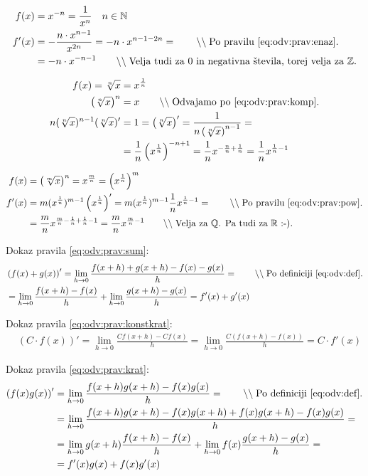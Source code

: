 \documentclass[a4paper,oneside,12pt,fleqn]{article}
\def\R{\ensuremath{\mathbb R}}
\def\N{\ensuremath{\mathbb N}}
\def\Z{\ensuremath{\mathbb Z}}
\def\Q{\ensuremath{\mathbb Q}}
\newcommand\krat\cdot
\newcommand{\comment}[1]{\ensuremath{\qquad\backslash\backslash\;}\textnormal{#1}}
\def\limh{\lim_{h\rightarrow0}} %
\numberwithin{equation}{section}
\begin{document}
\begin{align*}
  f(x) &= x^{-n} = \frac{1}{x^n}  \quad n \in \N \\
  f'(x) &= -\frac{n\krat x^{n-1}}{x^{2n}} = -n\krat x^{n-1-2n} = \comment{Po pravilu \eqref{eq:odv:prav:enaz}.} \\
  &= -n\krat x^{-n-1} \comment{Velja tudi za 0 in negativna števila, torej velja za $\Z$.}
\end{align*}

\begin{align*}
   f(x) = \sqrt[n]{x} &= x^{\frac{1}{n}} \\
  \left( \sqrt[n]{x} \right)^n &= x \comment{Odvajamo po \eqref{eq:odv:prav:komp}.} \\
  n(\sqrt[n]{x})^{n-1}(\sqrt[n]{x})' &= 1 =
  \left(\sqrt[n]{x}\right)' = \frac{1}{n\left(\sqrt[n]{x}\right)^{n-1}} =  \\
  & = \frac{1}{n}\left(x^{\frac{1}{n}}\right)^{-n+1} = \frac{1}{n}x^{-\frac{n}{n} +
  \frac{1}{n}} = \frac{1}{n}x^{\frac{1}{n}-1}
\end{align*}

\begin{align*}
  f(x) &= \left( \sqrt[m]{x}\right)^n = x^{\frac{m}{n}} = \left(x^{\frac{1}{n}}\right)^m \\
  f'(x) &= m(x^{\frac{1}{n}})^{m-1}\left( x^{\frac{1}{n}} \right)' =
  m(x^{\frac{1}{n}})^{m-1}\frac{1}{n}x^{\frac{1}{n}-1} = \comment{Po pravilu
  \eqref{eq:odv:prav:pow}.} \\
  &= \frac{m}{n}x^{\frac{m}{n}-\frac{1}{n}+\frac{1}{n} - 1} = \frac{m}{n}x^{\frac{m}{n}-1}
  \comment{Velja za \Q. Pa tudi za \R\ :-).}
\end{align*}

Dokaz pravila \eqref{eq:odv:prav:sum}:
\begin{align*}
  &\left( f(x)+g(x) \right)' = \limh\frac{f(x+h)+g(x+h)-f(x)-g(x)}{h} = \comment{Po definiciji \eqref{eq:odv:def}.} \\
  &= \limh\frac{f(x+h)-f(x)}{h} + \limh\frac{g(x+h)-g(x)}{h} =
  f'(x)+g'(x)
\end{align*}

Dokaz pravila \eqref{eq:odv:prav:konstkrat}:
\begin{align*}
  & (C\krat f(x))' = \limh\frac{Cf(x+h)-Cf(x)}{h} = \limh\frac{C(f(x+h)-f(x))}{h} = C\krat f'(x)
\end{align*}

Dokaz pravila \eqref{eq:odv:prav:krat}:
\begin{align*}
  \left( f(x)g(x) \right)' &= \limh \frac{f(x+h)g(x+h)-f(x)g(x)}{h} = \comment{Po definiciji \eqref{eq:odv:def}.} \\
  &= \limh \frac{f(x+h)g(x+h) - f(x)g(x+h) + f(x)g(x+h) - f(x)g(x)}{h} = \\
  &= \limh g(x+h)\frac{f(x+h)-f(x)}{h} +
  \limh f(x)\frac{g(x+h)-g(x)}{h} = \\
  &= f'(x)g(x)+f(x)g'(x)
\end{align*}
\end{document}
